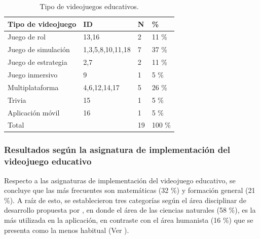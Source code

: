 \documentclass[spanish]{textolivre}
\begin{document}
\begin{table}[htbp]
\caption{Tipo de videojuegos educativos.}
\label{tbl7}
\centering
\begin{tabular}{l l l l}
\toprule 
\textbf{Tipo de videojuego} & \textbf{ID} & \textbf{N} & \textbf{\%}
\\
\midrule
Juego de rol & 13,16 & 2 & 11 \%
\\
Juego de simulación & 1,3,5,8,10,11,18 & 7 & 37 \%
\\
Juego de estrategia & 2,7 & 2 & 11 \%
\\
Juego inmersivo & 9 & 1 & 5 \% 
\\
Multiplataforma & 4,6,12,14,17 & 5 & 26 \%
\\
Trivia & 15 & 1 & 5 \%
\\
Aplicación móvil & 16 & 1 & 5 \%
\\
Total & & 19 & 100 \%
\\
\bottomrule
\end{tabular}
\end{table}


\subsubsection{Resultados según la asignatura de implementación del videojuego educativo}\label{sec-titulo}
Respecto a las asignaturas de implementación del videojuego educativo, se concluye que las más frecuentes son matemáticas (32 \%) y formación general (21 \%). A raíz de esto, se establecieron tres categorías según el área disciplinar de desarrollo propuesta por \textcite{de_frascati_manual_2015}, en donde el área de las ciencias naturales (58 \%), es la más utilizada en la aplicación, en contraste con el área humanista (16 \%) que se presenta como la menos habitual (Ver ).
\end{document}
